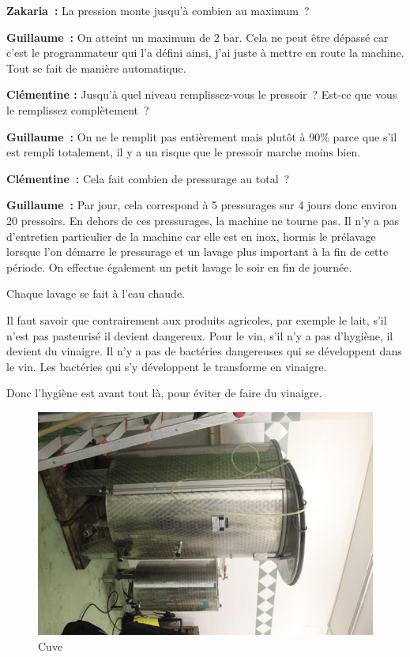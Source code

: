 \documentclass[a4paper, titlepage]{report}
\begin{document}
\textbf{Zakaria~:} La pression monte jusqu'à combien au maximum~?

\textbf{Guillaume~:} On atteint un maximum de 2 bar. Cela ne peut être
dépassé car c'est le programmateur qui l'a défini ainsi, j'ai juste à
mettre en route la machine. Tout se fait de manière automatique.

\textbf{Clémentine :} Jusqu'à quel niveau remplissez-vous le pressoir~?
Est-ce que vous le remplissez complètement~?

\textbf{Guillaume~:} On ne le remplit pas entièrement mais plutôt à 90\%
parce que s'il est rempli totalement, il y a un risque que le pressoir
marche moins bien.

\textbf{Clémentine~:} Cela fait combien de pressurage au total~?

\textbf{Guillaume~:} Par jour, cela correspond à 5 pressurages sur 4
jours donc environ 20 pressoirs. En dehors de ces pressurages, la
machine ne tourne pas. Il n'y a pas d'entretien particulier de la
machine car elle est en inox, hormis le prélavage lorsque l'on démarre
le pressurage et un lavage plus important à la fin de cette période. On
effectue également un petit lavage le soir en fin de journée.

Chaque lavage se fait à l'eau chaude.

Il faut savoir que contrairement aux produits agricoles, par exemple le
lait, s'il n'est pas pasteurisé il devient dangereux. Pour le vin, s'il
n'y a pas d'hygiène, il devient du vinaigre. Il n'y a pas de bactéries
dangereuses qui se développent dans le vin. Les bactéries qui s'y
développent le transforme en vinaigre.

Donc l'hygiène est avant tout là, pour éviter de faire du vinaigre.

\begin{figure}[!h]
\includegraphics{Images/cuve.jpg}
\caption{Cuve}
\end{figure}
\end{document}
